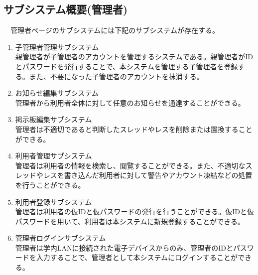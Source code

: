 \documentclass[a4j]{jarticle}
\begin{document}
\subsection{サブシステム概要(管理者)}
　管理者ページのサブシステムには下記のサブシステムが存在する。
\begin{enumerate}
  \item 子管理者管理サブシステム\\
  親管理者が子管理者のアカウントを管理するシステムである。親管理者がIDとパスワードを発行することで、本システムを管理する子管理者を登録する。また、不要になった子管理者のアカウントを抹消する。


  \item お知らせ編集サブシステム\\
  管理者から利用者全体に対して任意のお知らせを通達することができる。


  \item 掲示板編集サブシステム\\
  管理者は不適切であると判断したスレッドやレスを削除または置換することができる。


  \item 利用者管理サブシステム\\
  管理者は利用者の情報を検索し、閲覧することができる。また、不適切なスレッドやレスを書き込んだ利用者に対して警告やアカウント凍結などの処置を行うことができる。


  \item 利用者登録サブシステム\\
  管理者は利用者の仮IDと仮パスワードの発行を行うことができる。仮IDと仮パスワードを用いて、利用者は本システムに新規登録することができる。


  \item 管理者ログインサブシステム\\
  管理者は学内LANに接続された電子デバイスからのみ、管理者のIDとパスワードを入力することで、管理者として本システムにログインすることができる。
\end{enumerate}
\end{document}

